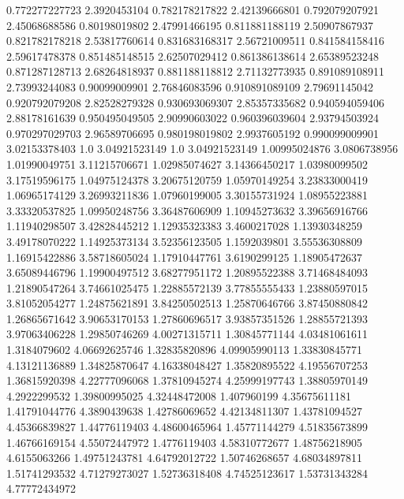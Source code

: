  0.772277227723     2.3920453104
 0.782178217822    2.42139666801
 0.792079207921    2.45068688586
  0.80198019802    2.47991466195
 0.811881188119    2.50907867937
 0.821782178218    2.53817760614
 0.831683168317    2.56721009511
 0.841584158416    2.59617478378
 0.851485148515    2.62507029412
 0.861386138614    2.65389523248
 0.871287128713    2.68264818937
 0.881188118812    2.71132773935
 0.891089108911    2.73993244083
  0.90099009901    2.76846083596
 0.910891089109    2.79691145042
 0.920792079208    2.82528279328
 0.930693069307    2.85357335682
 0.940594059406    2.88178161639
 0.950495049505    2.90990603022
 0.960396039604    2.93794503924
 0.970297029703    2.96589706695
 0.980198019802     2.9937605192
 0.990099009901    3.02153378403
            1.0    3.04921523149
            1.0    3.04921523149
  1.00995024876     3.0806738956
  1.01990049751    3.11215706671
  1.02985074627    3.14366450217
  1.03980099502    3.17519596175
  1.04975124378    3.20675120759
  1.05970149254    3.23833000419
  1.06965174129    3.26993211836
  1.07960199005    3.30155731924
  1.08955223881    3.33320537825
  1.09950248756    3.36487606909
  1.10945273632    3.39656916766
  1.11940298507    3.42828445212
  1.12935323383     3.4600217028
  1.13930348259    3.49178070222
  1.14925373134    3.52356123505
   1.1592039801    3.55536308809
  1.16915422886    3.58718605024
  1.17910447761     3.6190299125
  1.18905472637    3.65089446796
  1.19900497512    3.68277951172
  1.20895522388    3.71468484093
  1.21890547264    3.74661025475
  1.22885572139    3.77855555433
  1.23880597015    3.81052054277
  1.24875621891    3.84250502513
  1.25870646766    3.87450880842
  1.26865671642    3.90653170153
  1.27860696517    3.93857351526
  1.28855721393    3.97063406228
  1.29850746269    4.00271315711
  1.30845771144    4.03481061611
   1.3184079602    4.06692625746
  1.32835820896    4.09905990113
  1.33830845771    4.13121136889
  1.34825870647    4.16338048427
  1.35820895522    4.19556707253
  1.36815920398    4.22777096068
  1.37810945274    4.25999197743
  1.38805970149     4.2922299532
  1.39800995025    4.32448472008
    1.407960199    4.35675611181
  1.41791044776     4.3890439638
  1.42786069652    4.42134811307
  1.43781094527    4.45366839827
  1.44776119403    4.48600465964
  1.45771144279    4.51835673899
  1.46766169154    4.55072447972
   1.4776119403    4.58310772677
  1.48756218905     4.6155063266
  1.49751243781    4.64792012722
  1.50746268657    4.68034897811
  1.51741293532    4.71279273027
  1.52736318408    4.74525123617
  1.53731343284    4.77772434972
